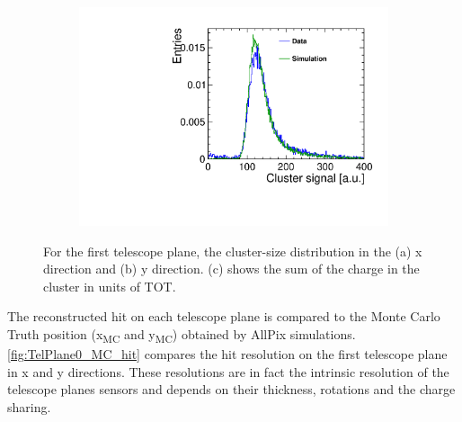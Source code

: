\begin{figure}[htbp]
\begin{subfigure}[b]{0.3\textwidth}
    \includegraphics[width=\textwidth]{figures/Telescope/biasedResiduals/clusterSignal_telescope0_data_simu.pdf}
    \caption{}
  \end{subfigure}
  \caption{For the first telescope plane, the cluster-size distribution in the (a) x direction and (b) y direction. (c) shows the sum of the charge in the cluster in units of TOT.} %
  \label{fig:TelescopeCluSize_data_simu}
\end{figure}

The reconstructed hit on each telescope plane is compared to the Monte
Carlo Truth position (x\textsubscript{MC} and y\textsubscript{MC})
obtained by AllPix simulations. \cref{fig:TelPlane0_MC_hit} compares
the hit resolution on the first telescope plane in x and y
directions. These resolutions are in fact the intrinsic resolution of
the telescope planes sensors and depends on their thickness, rotations
and the charge sharing.

